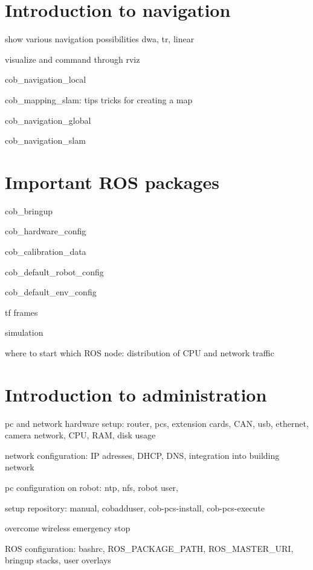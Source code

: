 \documentclass[12pt,twoside]{report}
\begin{document}
\section{Introduction to navigation}
show various navigation possibilities dwa, tr, linear

visualize and command through rviz

cob\_navigation\_local

cob\_mapping\_slam: tips tricks for creating a map

cob\_navigation\_global

cob\_navigation\_slam

\section{Important ROS packages}
cob\_bringup

cob\_hardware\_config

cob\_calibration\_data

cob\_default\_robot\_config

cob\_default\_env\_config

tf frames

simulation

where to start which ROS node: distribution of CPU and network traffic

\section{Introduction to administration}
pc and network hardware setup: router, pcs, extension cards, CAN, usb, ethernet, camera network, CPU, RAM, disk usage

network configuration: IP adresses, DHCP, DNS, integration into building network

pc configuration on robot: ntp, nfs, robot user, 

setup repository: manual, cobadduser, cob-pcs-install, cob-pcs-execute

overcome wireless emergency stop

ROS configuration: bashrc, ROS\_PACKAGE\_PATH, ROS\_MASTER\_URI, bringup stacks, user overlays
\end{document}

